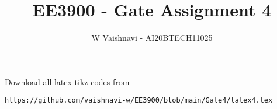 \documentclass[journal,12pt,twocolumn]{IEEEtran}
\DeclareMathOperator*{\Res}{Res}
\begin{document}
\newcommand{\BEQA}{\begin{eqnarray}}
\newcommand{\EEQA}{\end{eqnarray}}
\newcommand{\define}{\stackrel{\triangle}{=}}

\raggedbottom
\setlength{\parindent}{0pt}
\providecommand{\mbf}{\mathbf}
\providecommand{\pr}[1]{\ensuremath{\Pr\left(#1\right)}}
\providecommand{\qfunc}[1]{\ensuremath{Q\left(#1\right)}}
\providecommand{\sbrak}[1]{\ensuremath{{}\left[#1\right]}}
\providecommand{\lsbrak}[1]{\ensuremath{{}\left[#1\right.}}
\providecommand{\rsbrak}[1]{\ensuremath{{}\left.#1\right]}}
\providecommand{\brak}[1]{\ensuremath{\left(#1\right)}}
\providecommand{\lbrak}[1]{\ensuremath{\left(#1\right.}}
\providecommand{\rbrak}[1]{\ensuremath{\left.#1\right)}}
\providecommand{\cbrak}[1]{\ensuremath{\left\{#1\right\}}}
\providecommand{\lcbrak}[1]{\ensuremath{\left\{#1\right.}}
\providecommand{\rcbrak}[1]{\ensuremath{\left.#1\right\}}}
\theoremstyle{remark}
\newtheorem{rem}{Remark}
\newtheorem*{remark}{Remark}
\newcommand{\sgn}{\mathop{\mathrm{sgn}}}
\providecommand{\abs}[1]{\vert#1\vert}
\providecommand{\res}[1]{\Res\displaylimits_{#1}} 
\providecommand{\norm}[1]{\lVert#1\rVert}
\providecommand{\mtx}[1]{\mathbf{#1}}
\providecommand{\mean}[1]{E[ #1 ]}
\providecommand{\sinc}{sinc}
\providecommand{\fourier}{\overset{\mathcal{F}}{ \rightleftharpoons}}
\providecommand{\system}{\overset{\mathcal{H}}{ \longleftrightarrow}}
\newcommand{\solution}{\noindent \textbf{Solution: }}
\newcommand{\cosec}{\,\text{cosec}\,}
\providecommand{\dec}[2]{\ensuremath{\overset{#1}{\underset{#2}{\gtrless}}}}
\newcommand{\myvec}[1]{\ensuremath{\begin{pmatrix}#1\end{pmatrix}}}
\newcommand{\mydet}[1]{\ensuremath{\begin{vmatrix}#1\end{vmatrix}}}
\makeatletter
{}
\makeatother
\let\StandardTheFigure\thefigure
\let\vec\mathbf
\renewcommand{\thefigure}{\theproblem}
\def\putbox#1#2#3{\makebox[0in][l]{\makebox[#1][l]{}\raisebox{\baselineskip}[0in][0in]{\raisebox{#2}[0in][0in]{#3}}}}
     \def\rightbox#1{\makebox[0in][r]{#1}}
     \def\centbox#1{\makebox[0in]{#1}}
     \def\topbox#1{\raisebox{-\baselineskip}[0in][0in]{#1}}
     \def\midbox#1{\raisebox{-0.5\baselineskip}[0in][0in]{#1}}
\vspace{3cm}
\title{EE3900 - Gate Assignment 4}
\author{W Vaishnavi - AI20BTECH11025}
\maketitle
\newpage
\bigskip
\renewcommand{\thefigure}{\theenumi}
\renewcommand{\thetable}{\theenumi}
Download all latex-tikz codes from 
%
\begin{lstlisting}
https://github.com/vaishnavi-w/EE3900/blob/main/Gate4/latex4.tex
\end{lstlisting}
\end{document}
